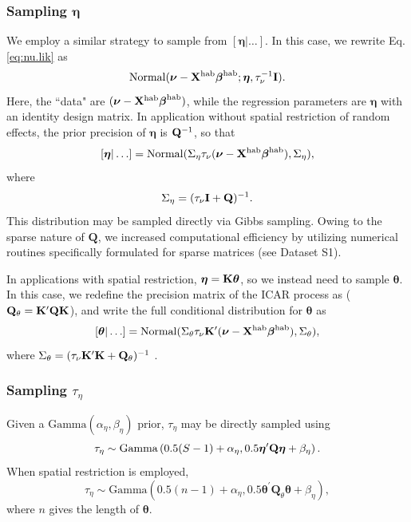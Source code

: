\documentclass[10pt]{article}
\newcommand{\bQ}{\ensuremath{\mathbf{Q}}}
\begin{document}
\subsubsection*{Sampling $\boldsymbol{\eta}$}

We employ a similar strategy to sample from  $[\boldsymbol{\eta}|\hdots]$.  In this case, we
rewrite Eq. \ref{eq:nu.lik} as
$$
{\rm Normal}(\boldsymbol{\nu}-{\bf X}^{\rm hab}\boldsymbol{\beta}^{\rm hab};\boldsymbol{\eta} ,\tau_\nu^{-1}{\bf I}).
$$
Here, the ``data" are $(\boldsymbol{\nu}-{\bf X}^{\rm hab}\boldsymbol{\beta}^{\rm hab})$, while the regression parameters are $\boldsymbol{\eta}$ with an identity design matrix. In application without spatial restriction of random effects, the prior precision of $\boldsymbol{\eta}$ is ${\bf Q}^{-1}$, so that
$$
[\boldsymbol{\eta}|\hdots] = {\rm Normal}(\Sigma_\eta \tau_\nu (\boldsymbol{\nu}-{\bf X}^{\rm hab}\boldsymbol{\beta}^{\rm hab}),\Sigma_\eta),
$$
where
$$
\Sigma_\eta=(\tau_\nu{\bf I} + {\bf Q})^{-1}.
$$
This distribution may be sampled directly via Gibbs sampling. Owing to the sparse nature of $\bQ$, we increased computational efficiency by utilizing numerical routines specifically formulated for sparse matrices (see Dataset S1).

In applications with spatial restriction, $\boldsymbol{\eta} = {\bf K}\boldsymbol{\theta}$, so we instead need to sample $\boldsymbol{\theta}$.  In this case, we redefine the precision matrix of the ICAR process as ($\bQ_\theta={\bf K}^\prime \bQ {\bf K}$), and write the full conditional distribution for $\boldsymbol{\theta}$ as
$$
[\boldsymbol{\theta}|\hdots] = {\rm Normal}(\Sigma_\theta \tau_\nu {\bf K}^\prime (\boldsymbol{\nu}-{\bf X}^{\rm hab}\boldsymbol{\beta}^{\rm hab}),\Sigma_\theta),
$$
where $\Sigma_\theta=(\tau_\nu {\bf K}^\prime {\bf K} + {\bf Q_\theta})^{-1}$ \cite{HughesHaran2012,JohnsonEtAl2012}.



\subsubsection*{Sampling $\tau_\eta$}
Given a $\textrm{Gamma}(\alpha_\eta,\beta_\eta)$ prior, $\tau_\eta$ may be directly sampled using
$$
\tau_\eta \sim \textrm{Gamma}\left( 0.5(S-1)+\alpha_\eta,0.5\boldsymbol{\eta}^\prime {\bf Q} \boldsymbol{\eta}+\beta_\eta \right).
$$
When spatial restriction is employed,
$$
\tau_\eta \sim \textrm{Gamma}\left( 0.5(n-1)+\alpha_\eta,0.5\boldsymbol{\theta}^\prime \bQ_\theta \boldsymbol{\theta} +\beta_\eta \right),
$$
where $n$ gives the length of $\boldsymbol{\theta}$.
\end{document}
